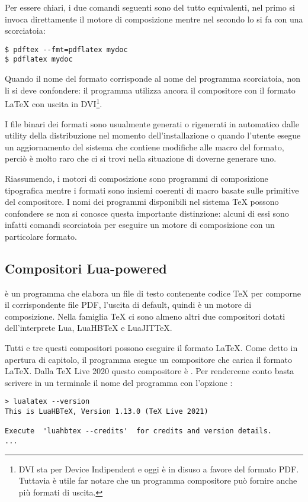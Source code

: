Per essere chiari, i due comandi seguenti sono del tutto equivalenti, nel primo
si invoca direttamente il motore di composizione mentre nel secondo lo si fa con
una scorciatoia:
\begin{Verbatim}[numbers=none]
$ pdftex --fmt=pdflatex mydoc
$ pdflatex mydoc
\end{Verbatim}

Quando il nome del formato corrisponde al nome del programma scorciatoia, non li
si deve confondere: il programma  utilizza ancora il compositore
 con il formato \LaTeX{} con uscita in DVI\footnote{DVI sta per
Device Indipendent e oggi è in disuso a favore del formato PDF. Tuttavia è utile
far notare che un programma compositore può fornire anche più formati di
uscita.}.

I file binari dei formati sono usualmente generati o rigenerati in automatico
dalle utility della distribuzione nel momento dell'installazione o quando
l'utente esegue un aggiornamento del sistema che contiene modifiche alle macro
del formato, perciò è molto raro che ci si trovi nella situazione di doverne
generare uno.

Riassumendo, i motori di composizione sono programmi di composizione tipografica
mentre i formati sono insiemi coerenti di macro basate sulle primitive del
compositore. I nomi dei programmi disponibili nel sistema \TeX{} possono
confondere se non si conosce questa importante distinzione: alcuni di essi sono
infatti comandi scorciatoia per eseguire un motore di composizione con un
particolare formato.


\subsection{Compositori Lua-powered}

\LuaTeX{} è un programma che elabora un file di testo contenente codice \TeX{}
per comporne il corrispondente file PDF, l'uscita di default, quindi è un motore
di composizione. Nella famiglia \TeX{} ci sono almeno altri due compositori
dotati dell'interprete Lua, LuaHB\TeX{} e LuaJIT\TeX{}.

Tutti e tre questi compositori possono eseguire il formato \LaTeX. Come detto in
apertura di capitolo, il programma  esegue un compositore che
carica il formato \LaTeX. Dalla TeX Live 2020 questo compositore è
. Per rendercene conto basta scrivere in un terminale il nome del
programma con l'opzione :
\begin{Verbatim}[numbers=none]
> lualatex --version
This is LuaHBTeX, Version 1.13.0 (TeX Live 2021)

Execute  'luahbtex --credits'  for credits and version details.
...
\end{Verbatim}


